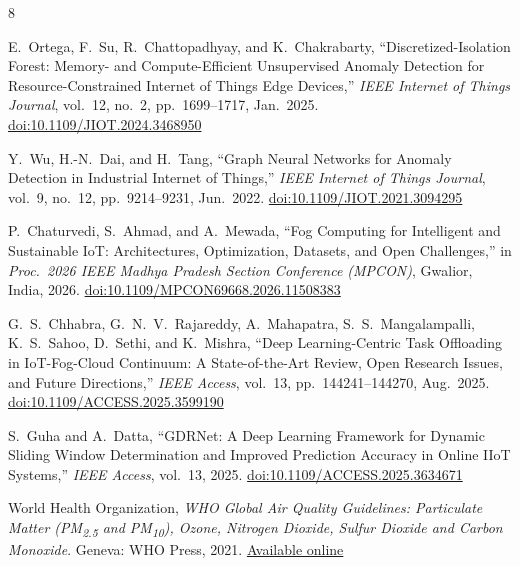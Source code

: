 \documentclass[10pt,a4paper]{article}
\begin{document}
\vspace{-0.5em}
\begin{thebibliography}{8}
\setlength{\itemsep}{-2pt}
\setlength{\parskip}{0pt}

E.~Ortega, F.~Su, R.~Chattopadhyay, and K.~Chakrabarty,
``Discretized-Isolation Forest: Memory- and Compute-Efficient Unsupervised Anomaly
Detection for Resource-Constrained Internet of Things Edge Devices,''
\textit{IEEE Internet of Things Journal}, vol.~12, no.~2, pp.~1699--1717, Jan.\ 2025.
\newblock \href{https://doi.org/10.1109/JIOT.2024.3468950}{doi:10.1109/JIOT.2024.3468950}

Y.~Wu, H.-N.~Dai, and H.~Tang,
``Graph Neural Networks for Anomaly Detection in Industrial Internet of Things,''
\textit{IEEE Internet of Things Journal}, vol.~9, no.~12, pp.~9214--9231, Jun.\ 2022.
\newblock \href{https://doi.org/10.1109/JIOT.2021.3094295}{doi:10.1109/JIOT.2021.3094295}

P.~Chaturvedi, S.~Ahmad, and A.~Mewada,
``Fog Computing for Intelligent and Sustainable IoT: Architectures, Optimization,
Datasets, and Open Challenges,''
in \textit{Proc.\ 2026 IEEE Madhya Pradesh Section Conference (MPCON)}, Gwalior, India, 2026.
\newblock \href{https://doi.org/10.1109/MPCON69668.2026.11508383}{doi:10.1109/MPCON69668.2026.11508383}

G.~S.~Chhabra, G.~N.~V.~Rajareddy, A.~Mahapatra, S.~S.~Mangalampalli, K.~S.~Sahoo, D.~Sethi, and K.~Mishra,
``Deep Learning-Centric Task Offloading in IoT-Fog-Cloud Continuum: A State-of-the-Art
Review, Open Research Issues, and Future Directions,''
\textit{IEEE Access}, vol.~13, pp.~144241--144270, Aug.\ 2025.
\newblock \href{https://doi.org/10.1109/ACCESS.2025.3599190}{doi:10.1109/ACCESS.2025.3599190}

S.~Guha and A.~Datta,
``GDRNet: A Deep Learning Framework for Dynamic Sliding Window Determination and
Improved Prediction Accuracy in Online IIoT Systems,''
\textit{IEEE Access}, vol.~13, 2025.
\newblock \href{https://doi.org/10.1109/ACCESS.2025.3634671}{doi:10.1109/ACCESS.2025.3634671}

World Health Organization,
\textit{WHO Global Air Quality Guidelines: Particulate Matter (PM\textsubscript{2.5}
and PM\textsubscript{10}), Ozone, Nitrogen Dioxide, Sulfur Dioxide and Carbon Monoxide}.
Geneva: WHO Press, 2021.
\newblock \href{https://www.who.int/publications/i/item/9789240034228}{Available online}


\end{thebibliography}
\end{document}
